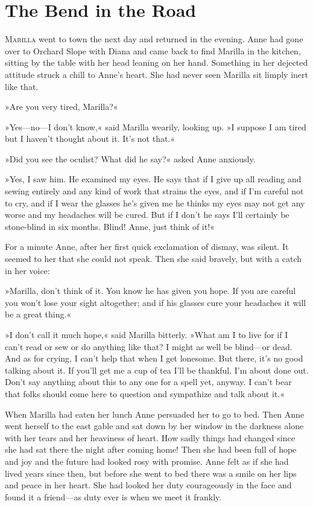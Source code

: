 \chapter{The Bend in the Road}

\lettrine[lines=4]{M}{arilla} went to town the next day and returned in the evening. Anne had gone over to Orchard Slope with Diana and came back to find Marilla in the kitchen, sitting by the table with her head leaning on her hand. Something in her dejected attitude struck a chill to Anne's heart. She had never seen Marilla sit limply inert like that.

»Are you very tired, Marilla?«

»Yes—no—I don't know,« said Marilla wearily, looking up. »I suppose I am tired but I haven't thought about it. It's not that.«

»Did you see the oculist? What did he say?« asked Anne anxiously.

»Yes, I saw him. He examined my eyes. He says that if I give up all reading and sewing entirely and any kind of work that strains the eyes, and if I'm careful not to cry, and if I wear the glasses he's given me he thinks my eyes may not get any worse and my headaches will be cured. But if I don't he says I'll certainly be stone-blind in six months. Blind! Anne, just think of it!«

For a minute Anne, after her first quick exclamation of dismay, was silent. It seemed to her that she could not speak. Then she said bravely, but with a catch in her voice:

»Marilla, don't think of it. You know he has given you hope. If you are careful you won't lose your sight altogether; and if his glasses cure your headaches it will be a great thing.«

»I don't call it much hope,« said Marilla bitterly. »What am I to live for if I can't read or sew or do anything like that? I might as well be blind—or dead. And as for crying, I can't help that when I get lonesome. But there, it's no good talking about it. If you'll get me a cup of tea I'll be thankful. I'm about done out. Don't say anything about this to any one for a spell yet, anyway. I can't bear that folks should come here to question and sympathize and talk about it.«

When Marilla had eaten her lunch Anne persuaded her to go to bed. Then Anne went herself to the east gable and sat down by her window in the darkness alone with her tears and her heaviness of heart. How sadly things had changed since she had sat there the night after coming home! Then she had been full of hope and joy and the future had looked rosy with promise. Anne felt as if she had lived years since then, but before she went to bed there was a smile on her lips and peace in her heart. She had looked her duty courageously in the face and found it a friend—as duty ever is when we meet it frankly.

